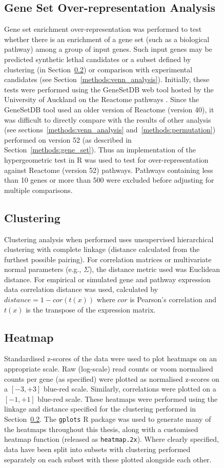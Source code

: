 \begin{figure}[!htp]
\subsection{Gene Set Over-representation Analysis} \label{methods:enrichment}
Gene set enrichment over-representation was performed to test whether there is an enrichment of a gene set (such as a biological pathway) among a group of input genes. Such input genes may be predicted synthetic lethal candidates or a subset defined by clustering (in Section~\ref{methods:clustering}) or comparison with experimental candidates (see Section~\ref{methods:venn_analysis}). Initially, these tests were performed using the GeneSetDB web tool \citep{genesetdb} hosted by the University of Auckland on the Reactome pathways \citep{Reactome}. Since the GeneSetDB tool used an older version of Reactome (version 40), it was difficult to directly compare with the results of other analysis (see sections~\ref{methods:venn_analysis} and~\ref{methods:permutation}) performed on version 52 (as described in  Section~\ref{methods:gene_set}). Thus an implementation of the hypergeometric test in R \citep{R_core} was used to test for over-representation against Reactome (version 52) pathways. Pathways containing less than 10 genes or more than 500 \citep[as performed in GeneSetDB by][]{genesetdb} were excluded before adjusting for multiple comparisons.

\subsection{Clustering} \label{methods:clustering}
Clustering analysis when performed uses unsupervised hierarchical clustering with complete linkage (distance calculated from the furthest possible pairing). For correlation matrices or multivariate normal parameters (e.g., $\Sigma$), the distance metric used was Euclidean distance. For empirical or simulated gene and pathway expression data correlation distance was used, calculated by $distance = 1 - cor(t(x))$ where $cor$ is Pearson's correlation and $t(x)$ is the transpose of the expression matrix. 

\subsection{Heatmap} \label{methods:heatmap}
Standardised z-scores of the data were used to plot heatmaps on an appropriate scale. Raw (log-scale) read counts or voom normalised counts per gene (as specified) were plotted  as normalised z-scores on a $[-3,+3]$ blue-red scale. Similarly, correlations were plotted on a $[-1,+1]$ blue-red scale. These heatmaps were performed using the linkage and distance specified for the clustering performed in Section~\ref{methods:clustering}. The \texttt{gplots} R package \citep{gplots} was used to generate many of the heatmaps throughout this thesis, along with a customised heatmap function (released as \texttt{heatmap.2x}). Where clearly specified, data have been split into subsets with clustering performed separately on each subset with these plotted alongside each other.


\end{figure}
